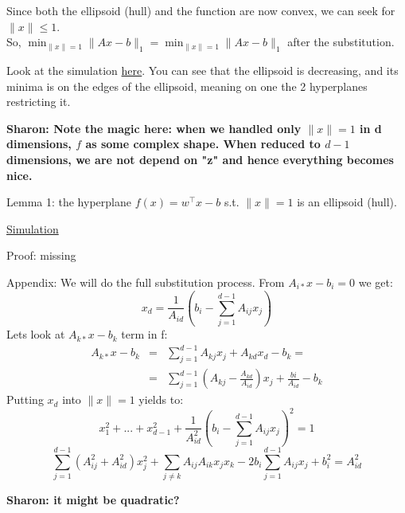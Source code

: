 \documentclass[12pt, a4paper]{article}
\newcommand{\sharon}[1]{{\footnotesize \bf\color{blue} Sharon: #1}}
\newcommand{\norm}[1]{\lVert #1 \rVert}
\begin{document}
Since both the ellipsoid (hull) and the function are now convex, we can seek for $\norm{x}\leq 1$.\\
So, $\min_{\norm{x}=1} \norm{Ax-b}_1=\min_{\norm{x}=1} \norm{Ax-b}_1$ after the substitution.

Look at the simulation \href{https://www.desmos.com/3d/3aeece6937}{here}. You can see that the ellipsoid is decreasing, and its minima is on the edges of the ellipsoid, meaning on one the 2 hyperplanes restricting it.

\sharon{Note the magic here: when we handled only $\norm{x}=1$ in d dimensions, $f$ as some complex shape. When reduced to $d-1$ dimensions, we are not depend on "z" and hence everything becomes nice.}

Lemma 1: the hyperplane $f(x)=w^\top x - b$ s.t. $\norm{x}=1$ is an ellipsoid (hull).

\href{https://www.desmos.com/3d/67af1e2194}{Simulation}

Proof: missing

Appendix: We will do the full substitution process. From $A_{i*}x-b_i=0$ we get:
\[x_d=\frac{1}{A_{id}}\left(b_i-\sum_{j=1}^{d-1} A_{ij}x_j\right)\]
Lets look at $A_{k*}x-b_k$ term in f:
\begin{eqnarray*}
    A_{k*}x-b_k&=&\sum_{j=1}^{d-1} A_{kj}x_j+A_{kd}x_d-b_k=\\
    &=&\sum_{j=1}^{d-1} (A_{kj}-\frac{A_{kd}}{A_{id}})x_j+\frac{bi}{A_{id}}-b_k
\end{eqnarray*}
Putting $x_d$ into $\norm{x}=1$ yields to:
\[x_1^2+...+x_{d-1}^2+\frac{1}{A_{id}^2}\left(b_i-\sum_{j=1}^{d-1} A_{ij}x_j\right)^2=1\]
\[\sum_{j=1}^{d-1} (A_{ij}^2+A_{id}^2)x_j^2+\sum_{j\ne k} A_{ij}A_{ik}x_jx_k-2b_i\sum_{j=1}^{d-1} A_{ij}x_j+b_i^2=A_{id}^2\]

\sharon{it might be quadratic?}

\newpage
\end{document}
